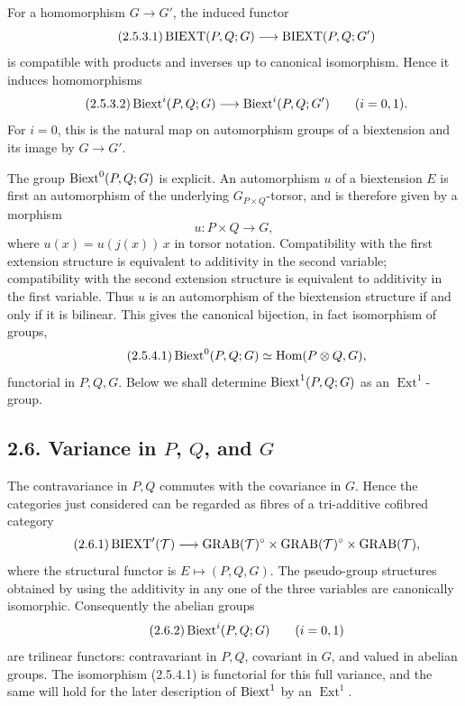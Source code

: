 \documentclass[11pt]{article}
\providecommand{\Ext}{\operatorname{Ext}}
\begin{document}
For a homomorphism \(G\to G'\), the induced functor
\begin{equation}\tag{2.5.3.1}
  \operatorname{BIEXT}(P,Q;G)\longrightarrow\operatorname{BIEXT}(P,Q;G')
\end{equation}
is compatible with products and inverses up to canonical isomorphism.  Hence it induces homomorphisms
\begin{equation}\tag{2.5.3.2}
  \operatorname{Biext}^i(P,Q;G)\longrightarrow\operatorname{Biext}^i(P,Q;G')\qquad (i=0,1).
\end{equation}
For \(i=0\), this is the natural map on automorphism groups of a biextension and its image by \(G\to G'\).

The group \(\operatorname{Biext}^0(P,Q;G)\) is explicit.  An automorphism \(u\) of a biextension \(E\) is first an automorphism of the underlying \(G_{P\times Q}\)-torsor, and is therefore given by a morphism
\begin{equation}\tag{2.5.4.0}
  u:P\times Q\longrightarrow G,
\end{equation}
where \(u(x)=u(j(x))\,x\) in torsor notation.  Compatibility with the first extension structure is equivalent to additivity in the second variable; compatibility with the second extension structure is equivalent to additivity in the first variable.  Thus \(u\) is an automorphism of the biextension structure if and only if it is bilinear.  This gives the canonical bijection, in fact isomorphism of groups,
\begin{equation}\tag{2.5.4.1}
  \operatorname{Biext}^0(P,Q;G)\simeq\operatorname{Hom}(P\otimes Q,G),
\end{equation}
functorial in \(P,Q,G\).  Below we shall determine \(\operatorname{Biext}^1(P,Q;G)\) as an \(\Ext^1\)-group.

\subsection*{2.6. Variance in \(P\), \(Q\), and \(G\)}
The contravariance in \(P,Q\) commutes with the covariance in \(G\).  Hence the categories just considered can be regarded as fibres of a tri-additive cofibred category
\begin{equation}\tag{2.6.1}
  \operatorname{BIEXT}'(\mathcal T)\longrightarrow
  \operatorname{GRAB}(\mathcal T)^\circ\times\operatorname{GRAB}(\mathcal T)^\circ\times\operatorname{GRAB}(\mathcal T),
\end{equation}
where the structural functor is \(E\mapsto(P,Q,G)\).  The pseudo-group structures obtained by using the additivity in any one of the three variables are canonically isomorphic.  Consequently the abelian groups
\begin{equation}\tag{2.6.2}
  \operatorname{Biext}^i(P,Q;G)\qquad (i=0,1)
\end{equation}
are trilinear functors: contravariant in \(P,Q\), covariant in \(G\), and valued in abelian groups.  The isomorphism (2.5.4.1) is functorial for this full variance, and the same will hold for the later description of \(\operatorname{Biext}^1\) by an \(\Ext^1\).
\end{document}
